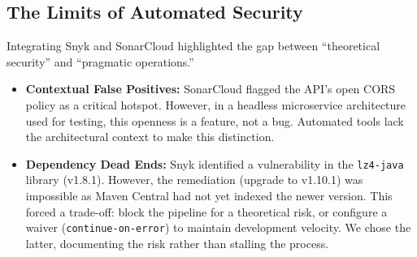 \subsection{The Limits of Automated Security}
Integrating Snyk and SonarCloud highlighted the gap between ``theoretical security'' and ``pragmatic operations.''
\begin{itemize}
    \item \textbf{Contextual False Positives:} SonarCloud flagged the API's open CORS policy as a critical hotspot. However, in a headless microservice architecture used for testing, this openness is a feature, not a bug. Automated tools lack the architectural context to make this distinction.
    \item \textbf{Dependency Dead Ends:} Snyk identified a vulnerability in the \texttt{lz4-java} library (v1.8.1). However, the remediation (upgrade to v1.10.1) was impossible as Maven Central had not yet indexed the newer version. This forced a trade-off: block the pipeline for a theoretical risk, or configure a waiver (\texttt{continue-on-error}) to maintain development velocity. We chose the latter, documenting the risk rather than stalling the process.
\end{itemize}